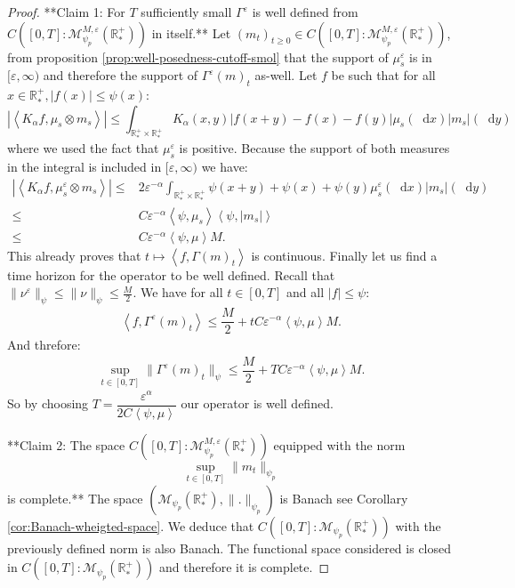 \documentclass[11pt,a4paper]{article}
\newcommand{\RRP}{\mathbb{R}^+_*}
\newcommand{\MC}{\mathcal{M}}
\newcommand{\Proc}[1]{\left(#1\right)_{t\geq 0}}
\newcommand{\brac}[1]{\left\langle#1\right\rangle}
\newcommand{\dd}{\mathop{}\!\mathrm{d}}
\begin{document}
\begin{proof}
    **Claim 1: For $T$ sufficiently small $\Gamma^\varepsilon$ is well defined from \(C\left([0,T]:\MC^{M,\varepsilon}_{\psi_p}\left(\RRP\right) \right) \) in itself.** Let $\Proc{m_t} \in C\left([0,T]:\MC^{M,\varepsilon}_{\psi_p}\left(\RRP\right) \right)$, from proposition \ref{prop:well-posedness-cutoff-smol} that the support of $\mu^\varepsilon_s$ is in $[\varepsilon,\infty)$ and therefore the support of $\Gamma^\varepsilon(m)_t$ as-well. Let $f$ be such that for all $x\in \RRP, |f(x)| \leq \psi(x)$:
    \[ \left|\brac{K_\alpha f,\mu_s\otimes m_s}\right| \leq \int_{\RRP\times \RRP} K_\alpha(x,y) \left|f(x+y) - f(x) -f(y)\right| \mu_s(\dd x)|m_s|(\dd y)
    \]
    where we used the fact that $\mu^\varepsilon_s $ is positive. Because the support of both measures in the integral is included in $[\varepsilon,\infty)$ we have:
    \begin{align*}
        \left|\brac{K_\alpha f,\mu^\varepsilon_s\otimes m_s}\right| \leq& 2\varepsilon^{-\alpha} \int_{\RRP\times \RRP} \psi(x+y) + \psi(x) + \psi(y)\mu^\varepsilon_s(\dd x)|m_s|(\dd y) \\
        \leq& C\varepsilon^{-\alpha}\brac{\psi,\mu_s} \brac{\psi,|m_s|}\\
        \leq& C\varepsilon^{-\alpha}\brac{\psi,\mu} M.
    \end{align*}
    This already proves that $t\mapsto \brac{f,\Gamma(m)_t}$ is continuous. Finally let us find a time horizon for the operator to be well defined. Recall that $\| \nu^\varepsilon\|_{\psi} \leq \| \nu\|_{\psi} \leq \frac{M}{2}$. We have for all $t \in [0,T]$ and all $|f|\leq \psi$:
    \begin{align*}
        \brac{f,\Gamma^\varepsilon(m)_t} \leq \dfrac{M}{2} + tC\varepsilon^{-\alpha}\brac{\psi,\mu} M.
    \end{align*}
    And threfore:
    \begin{align*}
        \sup\limits_{t\in [0,T]} \| \Gamma^\varepsilon(m)_t\|_{\psi} \leq \dfrac{M}{2} + TC\varepsilon^{-\alpha}\brac{\psi,\mu} M.
    \end{align*}
    So by choosing $T = \dfrac{\varepsilon^{\alpha}}{2C\brac{\psi,\mu}}$ our operator is well defined.

    **Claim 2: The space \(C\left([0,T]:\MC^{M,\varepsilon}_{\psi_p}\left(\RRP\right) \right) \) equipped with the norm 
     \[
    \sup\limits_{t \in [0,T]} \|m_t\|_{\psi_p}
    \]
    is complete.** The space \(\left(\MC_{\psi_p}\left(\RRP\right),\|.\|_{\psi_p}\right)\) is Banach see Corollary \ref{cor:Banach-wheigted-space}. We deduce that \(C\left([0,T]:\MC_{\psi_p}\left(\RRP\right) \right) \) with the previously defined norm is also Banach. The functional space considered is closed in \(C\left([0,T]:\MC_{\psi_p}\left(\RRP\right) \right) \) and therefore it is complete.  
    

\end{proof}
\end{document}
